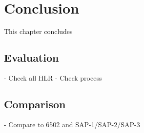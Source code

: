 \chapter{Conclusion}
This chapter concludes 
\section{Evaluation}
- Check all HLR 
- Check process
\section{Comparison}
- Compare to 6502 and SAP-1/SAP-2/SAP-3
